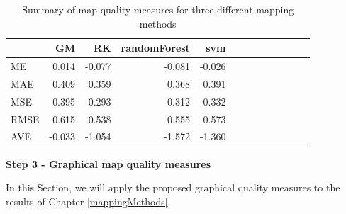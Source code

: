 \documentclass[10pt,b5paper,]{book}
\newenvironment{Shaded}{\begin{snugshade}}{\end{snugshade}}
\newcommand{\DataTypeTok}[1]{\textcolor[rgb]{0.13,0.29,0.53}{#1}}
\newcommand{\DecValTok}[1]{\textcolor[rgb]{0.00,0.00,0.81}{#1}}
\newcommand{\KeywordTok}[1]{\textcolor[rgb]{0.13,0.29,0.53}{\textbf{#1}}}
\newcommand{\NormalTok}[1]{#1}
\newcommand{\OperatorTok}[1]{\textcolor[rgb]{0.81,0.36,0.00}{\textbf{#1}}}
\newcommand{\OtherTok}[1]{\textcolor[rgb]{0.56,0.35,0.01}{#1}}
\newcommand{\StringTok}[1]{\textcolor[rgb]{0.31,0.60,0.02}{#1}}
\theoremstyle{definition}
\theoremstyle{definition}
\theoremstyle{definition}
\theoremstyle{remark}
\begin{document}
\begin{Shaded}
\end{Shaded}

\begin{table}

\caption{\label{tab:unnamed-chunk-85}Summary of map quality measures for three different mapping methods}
\centering
\begin{tabular}[t]{lrrrrrrrrrrrr}
\toprule
  & GM & RK & randomForest & svm\\
\midrule
ME & 0.014 & -0.077 & -0.081 & -0.026\\
MAE & 0.409 & 0.359 & 0.368 & 0.391\\
MSE & 0.395 & 0.293 & 0.312 & 0.332\\
RMSE & 0.615 & 0.538 & 0.555 & 0.573\\
AVE & -0.033 & -1.054 & -1.572 & -1.360\\
\bottomrule
\end{tabular}
\end{table}

\textbf{Step 3 - Graphical map quality measures}

In this Section, we will apply the proposed graphical quality measures
to the results of Chapter \ref{mappingMethods}.
\end{document}
